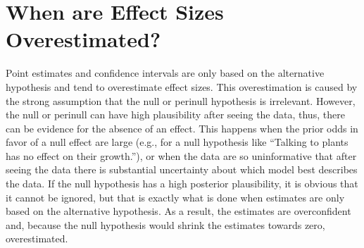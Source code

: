 \documentclass[a4paper]{article}
\begin{document}
\section*{When are Effect Sizes Overestimated?}
Point estimates and confidence intervals are only based on the alternative hypothesis and tend to overestimate effect sizes. This overestimation is caused by the strong assumption that the null or perinull hypothesis is irrelevant. However, the null or perinull can have high plausibility after seeing the data, thus, there can be evidence for the absence of an effect. This happens when the prior odds in favor of a null effect are large (e.g., for a null hypothesis like ``Talking to plants has no effect on their growth.''), or when the data are so uninformative that after seeing the data there is substantial uncertainty about which model best describes the data. If the null hypothesis has a high posterior plausibility, it is obvious that it cannot be ignored, but that is exactly what is done when estimates are only based on the alternative hypothesis. As a result, the estimates are overconfident and, because the null hypothesis would shrink the estimates towards zero, overestimated.
\end{document}
